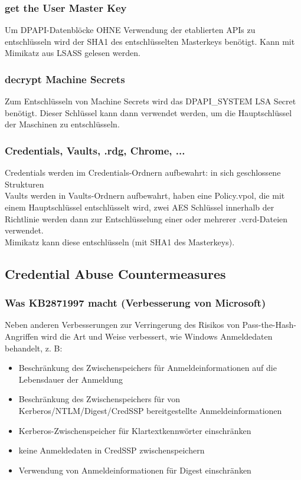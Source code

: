 \subsubsection{get the User Master Key}
Um DPAPI-Datenblöcke OHNE Verwendung der etablierten APIs zu entschlüsseln wird der SHA1 des entschlüsselten Masterkeys benötigt. Kann mit Mimikatz aus LSASS gelesen werden.

\subsubsection{decrypt Machine Secrets}
Zum Entschlüsseln von Machine Secrets wird das DPAPI\_SYSTEM LSA Secret benötigt. Dieser Schlüssel kann dann verwendet werden, um die Hauptschlüssel der Maschinen zu entschlüsseln.

\subsubsection{Credentials, Vaults, .rdg, Chrome, ...}
Credentials werden im Credentials-Ordnern aufbewahrt: in sich geschlossene Strukturen\\
Vaults werden in Vaults-Ordnern aufbewahrt, haben eine Policy.vpol, die mit einem Hauptschlüssel entschlüsselt wird, zwei AES Schlüssel innerhalb der Richtlinie werden dann zur Entschlüsselung einer oder mehrerer .vcrd-Dateien verwendet.\\
Mimikatz kann diese entschlüsseln (mit SHA1 des Masterkeys). %

\subsection{Credential Abuse Countermeasures}
\subsubsection{Was KB2871997 macht (Verbesserung von Microsoft)}
Neben anderen Verbesserungen zur Verringerung des Risikos von Pass-the-Hash-Angriffen wird die Art und Weise verbessert, wie Windows Anmeldedaten behandelt, z. B:
\begin{itemize}
    \item Beschränkung des Zwischenspeichers für Anmeldeinformationen auf die Lebensdauer der Anmeldung
    \item Beschränkung des Zwischenspeichers für von Kerberos/NTLM/Digest/CredSSP bereitgestellte Anmeldeinformationen
    \item Kerberos-Zwischenspeicher für Klartextkennwörter einschränken
    \item keine Anmeldedaten in CredSSP zwischenspeichern
    \item Verwendung von Anmeldeinformationen für Digest einschränken
\end{itemize}

